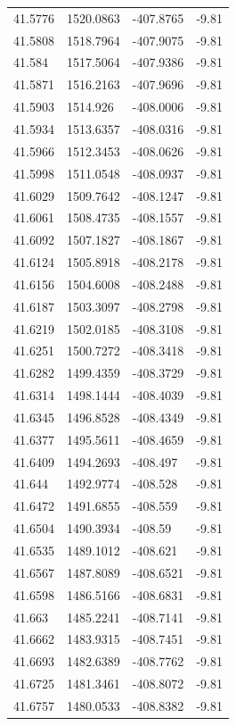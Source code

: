 \begin{table}[H]
\begin{tabular}{llll}
41.5776 & 1520.0863 & -407.8765 & -9.81 \\
41.5808 & 1518.7964 & -407.9075 & -9.81 \\
41.584 & 1517.5064 & -407.9386 & -9.81 \\
41.5871 & 1516.2163 & -407.9696 & -9.81 \\
41.5903 & 1514.926 & -408.0006 & -9.81 \\
41.5934 & 1513.6357 & -408.0316 & -9.81 \\
41.5966 & 1512.3453 & -408.0626 & -9.81 \\
41.5998 & 1511.0548 & -408.0937 & -9.81 \\
41.6029 & 1509.7642 & -408.1247 & -9.81 \\
41.6061 & 1508.4735 & -408.1557 & -9.81 \\
41.6092 & 1507.1827 & -408.1867 & -9.81 \\
41.6124 & 1505.8918 & -408.2178 & -9.81 \\
41.6156 & 1504.6008 & -408.2488 & -9.81 \\
41.6187 & 1503.3097 & -408.2798 & -9.81 \\
41.6219 & 1502.0185 & -408.3108 & -9.81 \\
41.6251 & 1500.7272 & -408.3418 & -9.81 \\
41.6282 & 1499.4359 & -408.3729 & -9.81 \\
41.6314 & 1498.1444 & -408.4039 & -9.81 \\
41.6345 & 1496.8528 & -408.4349 & -9.81 \\
41.6377 & 1495.5611 & -408.4659 & -9.81 \\
41.6409 & 1494.2693 & -408.497 & -9.81 \\
41.644 & 1492.9774 & -408.528 & -9.81 \\
41.6472 & 1491.6855 & -408.559 & -9.81 \\
41.6504 & 1490.3934 & -408.59 & -9.81 \\
41.6535 & 1489.1012 & -408.621 & -9.81 \\
41.6567 & 1487.8089 & -408.6521 & -9.81 \\
41.6598 & 1486.5166 & -408.6831 & -9.81 \\
41.663 & 1485.2241 & -408.7141 & -9.81 \\
41.6662 & 1483.9315 & -408.7451 & -9.81 \\
41.6693 & 1482.6389 & -408.7762 & -9.81 \\
41.6725 & 1481.3461 & -408.8072 & -9.81 \\
41.6757 & 1480.0533 & -408.8382 & -9.81 \\

\end{tabular}
\end{table}

